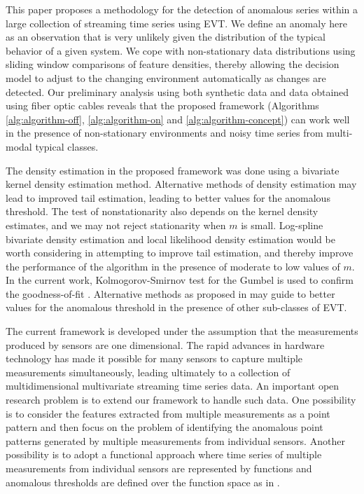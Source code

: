 \documentclass[12pt]{article}
\begin{document}
\label{sec:conclusion}

This paper proposes a methodology for the detection of anomalous series
within a large collection of streaming time series using EVT. We define
an anomaly here as an observation that is very unlikely given the
distribution of the typical behavior of a given system. We cope with
non-stationary data distributions using sliding window comparisons of
feature densities, thereby allowing the decision model to adjust to the
changing environment automatically as changes are detected. Our
preliminary analysis using both synthetic data and data obtained using
fiber optic cables reveals that the proposed framework (Algorithms
\ref{alg:algorithm-off}, \ref{alg:algorithm-on} and
\ref{alg:algorithm-concept}) can work well in the presence of
non-stationary environments and noisy time series from multi-modal
typical classes.

The density estimation in the proposed framework was done using a
bivariate kernel density estimation method. Alternative methods of
density estimation may lead to improved tail estimation, leading to
better values for the anomalous threshold. The test of nonstationarity
also depends on the kernel density estimates, and we may not reject
stationarity when \(m\) is small. Log-spline bivariate density
estimation \citep{kooperberg1991study} and local likelihood density
estimation \citep{loader1996local} would be worth considering in
attempting to improve tail estimation, and thereby improve the
performance of the algorithm in the presence of moderate to low values
of \(m\). In the current work, Kolmogorov-Smirnov test for the Gumbel is
used to confirm the goodness-of-fit \citep{marshall2007life}.
Alternative methods as proposed in \citep{clifton2014extending} may
guide to better values for the anomalous threshold in the presence of
other sub-classes of EVT.

The current framework is developed under the assumption that the
measurements produced by sensors are one dimensional. The rapid advances
in hardware technology has made it possible for many sensors to capture
multiple measurements simultaneously, leading ultimately to a collection
of multidimensional multivariate streaming time series data. An
important open research problem is to extend our framework to handle
such data. One possibility is to consider the features extracted from
multiple measurements as a point pattern
\citep{luca2014anomaly, luca2016one, luca2018point} and then focus on
the problem of identifying the anomalous point patterns generated by
multiple measurements from individual sensors. Another possibility is to
adopt a functional approach where time series of multiple measurements
from individual sensors are represented by functions and anomalous
thresholds are defined over the function space as in
\citep{clifton2013extreme}.
\end{document}
